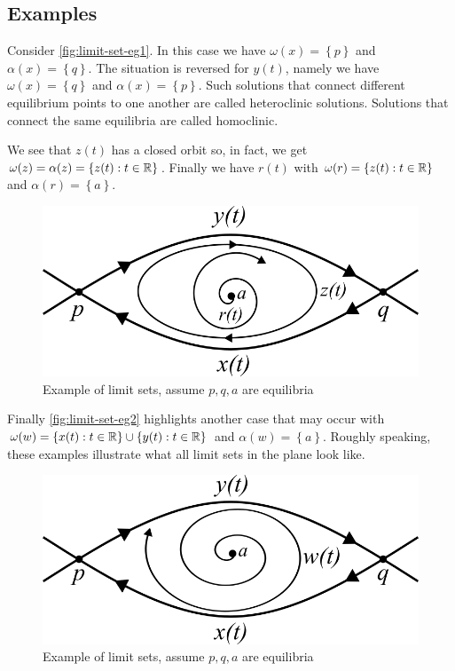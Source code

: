 \subsection{Examples}
Consider \autoref{fig:limit-set-eg1}. In this case we have $\omega(x) = \left\{p\right\}$ and $\alpha(x) = \left\{q\right\}$. The situation is reversed for $y(t)$, namely we have $\omega(x) = \left\{q\right\}$ and $\alpha(x) = \left\{p\right\}$. Such solutions that connect different equilibrium points to one another are called heteroclinic solutions. Solutions that connect the same equilibria are called homoclinic.

We see that $z(t)$ has a closed orbit so, in fact, we get $\omega(z) = \alpha(z) = \left\{ z(t): t \in \mathbb{R} \right\}$. Finally we have $r(t)$ with $\omega(r) = \left\{z(t): t \in \mathbb{R} \right\}$ and $\alpha(r) = \left\{a\right\}$.
\begin{figure}[h]
    \centering
    \includegraphics[scale=0.5]{Images/limit_set_eg1.png}
    \caption{Example of limit sets, assume $p, q, a$ are equilibria}
    \label{fig:limit-set-eg1}
\end{figure}
Finally \autoref{fig:limit-set-eg2} highlights another case that may occur with $\omega(w) = \left\{x(t): t \in \mathbb{R} \right\} \cup \left\{y(t): t \in \mathbb{R} \right\}$ and $\alpha(w) = \left\{a\right\}$. Roughly speaking, these examples illustrate what all limit sets in the plane look like.

\begin{figure}[h]
    \centering
    \includegraphics[scale=0.5]{Images/limit_set_eg2.png}
    \caption{Example of limit sets, assume $p, q, a$ are equilibria}
    \label{fig:limit-set-eg2}
\end{figure}


